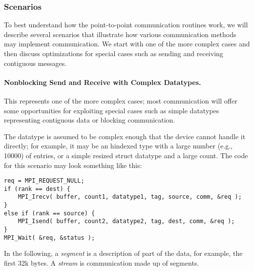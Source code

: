 \subsubsection{Scenarios}
\label{sec:pt-2-pt-scenarios}

To best understand how the point-to-point communication routines work, we will
describe several scenarios that illustrate how various communication methods
may implement communication.  We start with one of the more complex cases and
then discuss optimizations for special cases such as sending and receiving
contiguous messages.

\paragraph{Nonblocking Send and Receive with Complex Datatypes.}
This represents one of the more complex cases; most communication will offer
some opportunities for exploiting special cases such as simple datatypes
representing contiguous data or blocking communication.  

The datatype is assumed to be complex enough that the device cannot handle it
directly; for example, it may be an hindexed type with a large number (e.g.,
10000) of entries, or a simple resized struct datatype and a large count.
The code for this scenario may look something like this:
\begin{verbatim}
req = MPI_REQUEST_NULL;
if (rank == dest) {
    MPI_Irecv( buffer, count1, datatype1, tag, source, comm, &req );
}
else if (rank == source) {
    MPI_Isend( buffer, count2, datatype2, tag, dest, comm, &req );
}
MPI_Wait( &req, &status );
\end{verbatim}

In the following, a \emph{segment} is a description of part of the data, for
example, the first 32k bytes.  A \emph{stream} is communication made up of
segments.

